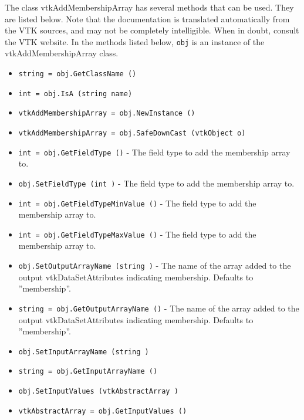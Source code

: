 The class vtkAddMembershipArray has several methods that can be used.
  They are listed below.
Note that the documentation is translated automatically from the VTK sources,
and may not be completely intelligible.  When in doubt, consult the VTK website.
In the methods listed below, \verb|obj| is an instance of the vtkAddMembershipArray class.
\begin{itemize}
\item  \verb|string = obj.GetClassName ()|

\item  \verb|int = obj.IsA (string name)|

\item  \verb|vtkAddMembershipArray = obj.NewInstance ()|

\item  \verb|vtkAddMembershipArray = obj.SafeDownCast (vtkObject o)|

\item  \verb|int = obj.GetFieldType ()| -  The field type to add the membership array to.

\item  \verb|obj.SetFieldType (int )| -  The field type to add the membership array to.

\item  \verb|int = obj.GetFieldTypeMinValue ()| -  The field type to add the membership array to.

\item  \verb|int = obj.GetFieldTypeMaxValue ()| -  The field type to add the membership array to.

\item  \verb|obj.SetOutputArrayName (string )| -  The name of the array added to the output vtkDataSetAttributes 
 indicating membership. Defaults to ''membership''.

\item  \verb|string = obj.GetOutputArrayName ()| -  The name of the array added to the output vtkDataSetAttributes 
 indicating membership. Defaults to ''membership''.

\item  \verb|obj.SetInputArrayName (string )|

\item  \verb|string = obj.GetInputArrayName ()|

\item  \verb|obj.SetInputValues (vtkAbstractArray )|

\item  \verb|vtkAbstractArray = obj.GetInputValues ()|

\end{itemize}

